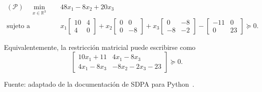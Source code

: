\begin{table}[H]
\centering
\caption{Problema SDP asociado al ejemplo en formato SDPA.}
\label{tab:sdpa_problem_example}
\begin{minipage}{0.9\textwidth}
\[
\begin{aligned}
(\mathcal{P})\quad
\min_{x\in\mathbb{R}^3}\quad
& 48x_1 - 8x_2 + 20x_3 \\
\text{sujeto a}\quad
& x_1
\begin{bmatrix}
10 & 4 \\
4 & 0
\end{bmatrix}
 + x_2
\begin{bmatrix}
0 & 0 \\
0 & -8
\end{bmatrix}
 + x_3
\begin{bmatrix}
0 & -8 \\
-8 & -2
\end{bmatrix}
 -
\begin{bmatrix}
-11 & 0 \\
0 & 23
\end{bmatrix}
\succeq 0.
\end{aligned}
\]

Equivalentemente, la restricción matricial puede escribirse como
\[
\begin{bmatrix}
10x_1 + 11 & 4x_1 - 8x_3 \\
4x_1 - 8x_3 & -8x_2 - 2x_3 - 23
\end{bmatrix}
\succeq 0.
\]
\end{minipage}

\vspace{0.15cm}
{\footnotesize Fuente: adaptado de la documentación de SDPA para Python~\cite{SDPAFormat}.}
\end{table}
